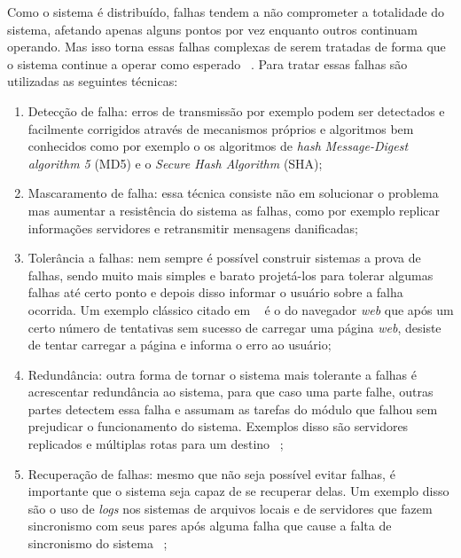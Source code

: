         Como o sistema é distribuído, falhas tendem a não comprometer a totalidade do sistema, afetando apenas alguns pontos  por vez enquanto outros continuam operando. Mas isso torna essas falhas complexas de serem tratadas de forma que o sistema continue a operar como esperado ~\cite{coulouris}. Para tratar essas falhas são utilizadas as seguintes técnicas:
        \begin{enumerate}
    
            \item Detecção de falha: erros de transmissão por exemplo podem ser detectados e facilmente corrigidos através de mecanismos próprios e algoritmos bem conhecidos como por exemplo o os algoritmos de \textit{hash} \textit{Message-Digest algorithm 5} (MD5) e o \textit{Secure Hash Algorithm} (SHA);
            
            \item Mascaramento de falha: essa técnica consiste não em solucionar o problema mas aumentar a resistência do sistema as falhas, como por exemplo replicar informações servidores e retransmitir mensagens danificadas;
            
            \item Tolerância a falhas: nem sempre é possível construir sistemas a prova de falhas, sendo muito mais simples e barato projetá-los para tolerar algumas falhas até certo ponto e depois disso informar o usuário sobre a falha ocorrida. Um exemplo clássico citado em ~\cite{coulouris} é o do navegador \textit{web} que após um certo número de tentativas sem sucesso de carregar uma página \textit{web}, desiste de tentar carregar a página e informa o erro ao usuário;
            
            \item Redundância: outra forma de tornar o sistema mais tolerante a falhas é acrescentar redundância ao sistema, para que caso uma parte falhe, outras partes detectem essa falha e assumam as tarefas do módulo que falhou sem prejudicar o funcionamento do sistema. Exemplos disso são servidores replicados e múltiplas rotas para um destino ~\cite{coulouris};
            
            \item Recuperação de falhas: mesmo que não seja possível evitar falhas, é importante que o sistema seja capaz de se recuperar delas. Um exemplo disso são o uso de \textit{logs} nos sistemas de arquivos locais e de servidores que fazem sincronismo com seus pares após alguma falha que cause a falta de sincronismo do sistema ~\cite{coulouris};
            
        \end{enumerate}
    
